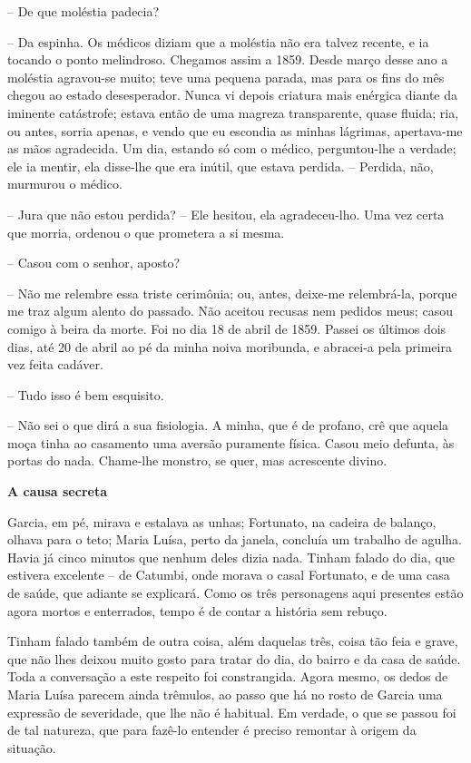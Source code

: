 -- De que moléstia padecia?

-- Da espinha. Os médicos diziam que a moléstia não era talvez recente,
e ia tocando o ponto melindroso. Chegamos assim a 1859. Desde março
desse ano a moléstia agravou-se muito; teve uma pequena parada, mas para
os fins do mês chegou ao estado desesperador. Nunca vi depois criatura
mais enérgica diante da iminente catástrofe; estava então de uma magreza
transparente, quase fluida; ria, ou antes, sorria apenas, e vendo que eu
escondia as minhas lágrimas, apertava-me as mãos agradecida. Um dia,
estando só com o médico, perguntou-lhe a verdade; ele ia mentir, ela
disse-lhe que era inútil, que estava perdida. -- Perdida, não, murmurou
o médico.

-- Jura que não estou perdida? -- Ele hesitou, ela agradeceu-lho. Uma
vez certa que morria, ordenou o que prometera a si mesma.

-- Casou com o senhor, aposto?

-- Não me relembre essa triste cerimônia; ou, antes, deixe-me
relembrá-la, porque me traz algum alento do passado. Não aceitou recusas
nem pedidos meus; casou comigo à beira da morte. Foi no dia 18 de abril
de 1859. Passei os últimos dois dias, até 20 de abril ao pé da minha
noiva moribunda, e abracei-a pela primeira vez feita cadáver.

-- Tudo isso é bem esquisito.

-- Não sei o que dirá a sua fisiologia. A minha, que é de profano, crê
que aquela moça tinha ao casamento uma aversão puramente física. Casou
meio defunta, às portas do nada. Chame-lhe monstro, se quer, mas
acrescente divino.

\textbf{A causa secreta}

Garcia, em pé, mirava e estalava as unhas; Fortunato, na cadeira de
balanço, olhava para o teto; Maria Luísa, perto da janela, concluía um
trabalho de agulha. Havia já cinco minutos que nenhum deles dizia nada.
Tinham falado do dia, que estivera excelente -- de Catumbi, onde morava
o casal Fortunato, e de uma casa de saúde, que adiante se explicará.
Como os três personagens aqui presentes estão agora mortos e enterrados,
tempo é de contar a história sem rebuço.

Tinham falado também de outra coisa, além daquelas três, coisa tão feia
e grave, que não lhes deixou muito gosto para tratar do dia, do bairro e
da casa de saúde. Toda a conversação a este respeito foi constrangida.
Agora mesmo, os dedos de Maria Luísa parecem ainda trêmulos, ao passo
que há no rosto de Garcia uma expressão de severidade, que lhe não é
habitual. Em verdade, o que se passou foi de tal natureza, que para
fazê-lo entender é preciso remontar à origem da situação.

